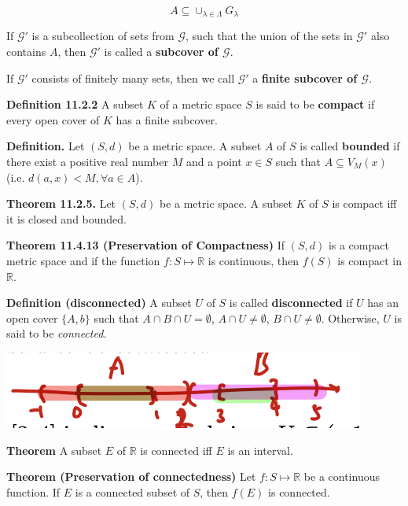\documentclass[10pt,landscape]{article}
\begin{document}
\begin{multicols}{4}
$$
A \subseteq \cup_{\lambda \in \Lambda} G_{\lambda}
$$

If $\mathcal{G'}$ is a subcollection of sets from $\mathcal{G}$, such that the union of the sets in $\mathcal{G'}$ also contains $A$, then $\mathcal{G'}$ is called a \textbf{subcover of $\mathcal{G}$}.

If $\mathcal{G'}$ consists of finitely many sets, then we call $\mathcal{G'}$ a \textbf{finite subcover of $\mathcal{G}$}.

\textbf{Definition 11.2.2} A subset $K$ of a metric space $S$ is said to be \textbf{compact} if every open cover of $K$ has a finite subcover.

\textbf{Definition.} Let $(S, d)$ be a metric space. A subset $A$ of $S$ is called \textbf{bounded} if there exist a positive real number $M$ and a point $x \in S$ such that $A \subseteq V_M(x)$ (i.e. $d(a, x) < M, \forall a \in A$).

\textbf{Theorem 11.2.5.} Let $(S, d)$ be a metric space. A subset $K$ of $S$ is compact iff it is closed and bounded.


\textbf{Theorem 11.4.13 (Preservation of Compactness)} If $(S, d)$ is a compact metric space and if the function $f: S \mapsto \mathbb{R}$ is continuous, then $f(S)$ is compact in $\mathbb{R}$.


\textbf{Definition (disconnected)} A subset $U$ of $S$ is called \textbf{disconnected} if $U$ has an open cover $\{ A, b \}$ such that $A \cap B \cap U = \emptyset$, $A \cap U \neq \emptyset$, $B \cap U \neq \emptyset$. Otherwise, $U$ is said to be \textit{connected.}

\includegraphics[width=\columnwidth]{images/disconnected.png}

\textbf{Theorem} A subset $E$ of $\mathbb{R}$ is connected iff $E$ is an interval.

\textbf{Theorem (Preservation of connectedness)} Let $f: S \mapsto \mathbb{R}$ be a continuous function. If $E$ is a connected subset of $S$, then $f(E)$ is connected.


\end{multicols}
\end{document}
